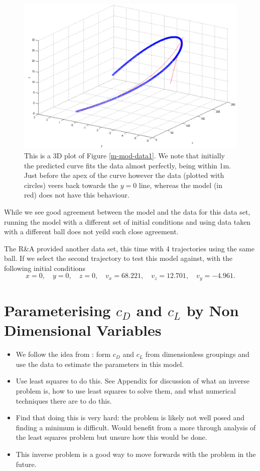 \begin{figure}[h]
\centering
\includegraphics[scale=0.5]{../images/m-mod-data1-3d.png}
\caption[Model with using the modified Morrison form for $c_D$ in 3D.]{This is a 3D plot of Figure \ref{m-mod-data1}.
We note that initially the predicted curve fits the data almost perfectly, being within 1m. Just before
the apex of the curve however the data (plotted with circles) veers back towards the $y=0$ line, whereas
the model (in red) does not have this behaviour.}
\end{figure}

While we see good agreement between the model and the data for this data set, running the model with
a different set of initial conditions and using data taken with a different ball does not yeild such
close agreement.

The R\&A provided another data set, this time with 4 trajectories using the same ball. If we select
the second trajectory to test this model against, with the following initial conditions
\[
x = 0, \quad y = 0, \quad z = 0, \quad v_x = 68.221, \quad v_z = 12.701, \quad v_y = -4.961 .
\]

\section{Parameterising $c_{D}$ and $c_{L}$ by Non Dimensional Variables}

\begin{itemize}
\item We follow the idea from \citet{Lieberman2001}: form $c_{D}$ and $c_{L}$ from dimensionless
groupings and use the data to estimate the parameters in this model.
\item Use least squares to do this. See Appendix for discussion of what an inverse problem is, how
to use least squares to solve them, and what numerical techniques there are to do this.
\item Find that doing this is very hard: the problem is likely not well posed and finding a minimum
is difficult. Would benefit from a more through analysis of the least squares problem but unsure how
this would be done.
\item This inverse problem is a good way to move forwards with the problem in the future.
\end{itemize}

